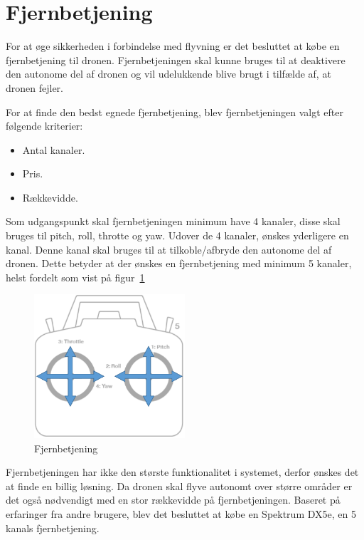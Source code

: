 \section{Fjernbetjening}

For at øge sikkerheden i forbindelse med flyvning er det besluttet at købe en fjernbetjening til dronen. Fjernbetjeningen skal kunne bruges til at deaktivere den autonome del af dronen og vil udelukkende blive brugt i tilfælde af, at dronen fejler. 

For at finde den bedst egnede fjernbetjening, blev fjernbetjeningen valgt efter følgende kriterier:

\begin{itemize}
	\item Antal kanaler.
	\item Pris.
	\item Rækkevidde.
\end{itemize}

Som udgangspunkt skal fjernbetjeningen minimum have 4 kanaler, disse skal bruges til pitch, roll, throtte og yaw. Udover de 4 kanaler, ønskes yderligere en kanal. Denne kanal skal bruges til at tilkoble/afbryde den autonome del af dronen. Dette betyder at der ønskes en fjernbetjening med minimum 5 kanaler, helst fordelt som vist på figur~\ref{fig:fjernbetjening} 

\begin{figure}[H]
\centering
\includegraphics[width=0.5\textwidth]{Billeder/Fjernbetjening}
\caption{Fjernbetjening}
\label{fig:fjernbetjening}
\end{figure}

Fjernbetjeningen har ikke den største funktionalitet i systemet, derfor ønskes det at finde en billig løsning. Da dronen skal flyve autonomt over større områder er det også nødvendigt med en stor rækkevidde på fjernbetjeningen. Baseret på erfaringer fra andre brugere, blev det besluttet at købe en Spektrum DX5e, en 5 kanals fjernbetjening.
